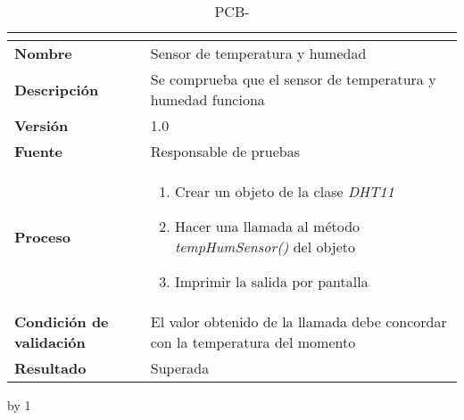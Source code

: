 \begin{table}[H]
	\caption{PCB-\number\pcb}
	\begin{tabular}{|l|p{}|}
		\hline
		\multicolumn{2}{|c|}{\cellcolor[HTML]{BFBFBF}{\color[HTML]{000000} \textbf{PCB-\number\pcb}}} \\ \hline
		\textbf{Nombre}                  & Sensor de temperatura y humedad                                               \\ \hline
		\textbf{Descripción}             & Se comprueba que el sensor de temperatura y humedad funciona                  \\ \hline
		\textbf{Versión}                 & 1.0                                                                           \\ \hline
		\textbf{Fuente}                  & Responsable de pruebas                                                        \\ \hline
		\textbf{Proceso}                 & \begin{enumerate}
			\item Crear un objeto de la clase \textit{DHT11}
			\item Hacer una llamada al método \textit{tempHumSensor()} del objeto
			\item Imprimir la salida por pantalla
		\end{enumerate}                                                    \\ \hline
		\textbf{Condición de validación} & El valor obtenido de la llamada debe concordar con la temperatura del momento \\ \hline
		\textbf{Resultado}               & Superada                                                                      \\ \hline
	\end{tabular}
\end{table}
\advance\pcb by 1

